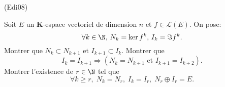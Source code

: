 \begin{tiny}(Edi08)\end{tiny} 
Soit $E$ un $\mathbf{K}$-espace vectoriel de dimension $n$ et $f \in \mathcal{L}(E)$. On pose:
\[
  \forall k \in \N,\, N_{k}=\ker f^{k},\, I_{k} = \Im f^{k}.
\]
 Montrer que $N_{k}\subset N_{k+1}$ et $I_{k+1}\subset I_{k}$. Montrer que 
\[
  I_{k}=I_{k+1} \Rightarrow \left(N_{k}=N_{k+1}\text{ et } I_{k+1}=I_{k+2}\right).
\]
Montrer l'existence de $r \in \N$ tel que
\[
\forall k\geq r, \; N_{k}=N_{r}, \; I_{k}= I_{r}, \; N_{r} \oplus I_{r} = E .
\]
